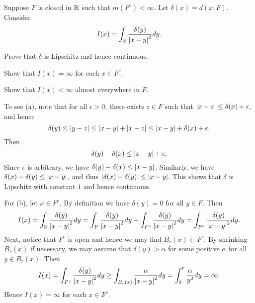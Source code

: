 \begin{exercise}
    Suppose $F$ is closed in $\mathbb{R}$ such that $m(F^c)<\infty$. Let $\delta(x) 
    = d(x, F)$. Consider 
    \begin{equation*}
        I(x) = \int_{\mathbb{R}} \frac{\delta(y)}{\left\lvert {x-y} \right\rvert^2}dy.
    \end{equation*}
    \begin{thmenum}
        \item Prove that $\delta$ is Lipschitz and hence continuous.
        \item Show that $I(x)=\infty$ for each $x\in F^c$.
        \item Show that $I(x)<\infty$ almost everywhere in $F$.
    \end{thmenum}
\end{exercise}
\begin{pf}
    To see (a), note that for all $\epsilon>0$, there exists $z\in F$ such that 
    $\left\lvert {x-z} \right\rvert\leq \delta(x)+\epsilon$, and hence 
    \begin{equation*}
        \delta(y) \leq \left\lvert {y-z} \right\rvert \leq \left\lvert {x-y} \right\rvert + \left\lvert {x-z} \right\rvert \leq \left\lvert {x-y} \right\rvert + \delta(x) + \epsilon.
    \end{equation*}
    Then 
    \begin{equation*}
        \delta(y)-\delta(x) \leq \left\lvert {x-y} \right\rvert + \epsilon.
    \end{equation*}
    Since $\epsilon$ is arbitrary, we have $\delta(y)-\delta(x)\leq \left\lvert {x-y} \right\rvert$. 
    Similarly, we have $\delta(x)-\delta(y)\leq \left\lvert {x-y} \right\rvert$, and thus 
    $\left\lvert {\delta(x)-\delta(y)} \right\rvert\leq \left\lvert {x-y} \right\rvert$. This shows that $\delta$ is 
    Lipschitz with constant $1$ and hence continuous.

    For (b), let $x\in F^c$. By definition we have $\delta(y)=0$ for all 
    $y\in F$. Then 
    \begin{equation*}
        I(x) = \int_{\mathbb{R}} \frac{\delta(y)}{\left\lvert {x-y} \right\rvert^2}dy 
        = \int_{F} \frac{\delta(y)}{\left\lvert {x-y} \right\rvert^2}dy + \int_{F^c} \frac{\delta(y)}{\left\lvert {x-y} \right\rvert^2}dy
        = \int_{F^c} \frac{\delta(y)}{\left\lvert {x-y} \right\rvert^2}dy.
    \end{equation*}
    Next, notice that $F^c$ is open and hence we may find $B_r(x)\subset F^c$. 
    By shrinking $B_r(x)$ if necessary, we may assume that $\delta(y)>\alpha$ for 
    some positive $\alpha$ for all $y\in B_r(x)$. Then 
    \begin{equation*}
        I(x) = \int_{F^c} \frac{\delta(y)}{\left\lvert {x-y} \right\rvert^2}dy 
        \geq \int_{B_r(x)} \frac{\alpha}{\left\lvert {x-y} \right\rvert^2}dy 
        = \int_{0}^{r} \frac{\alpha}{y^2}dy = \infty.
    \end{equation*}
    Hence $I(x)=\infty$ for each $x\in F^c$.


\end{pf}
